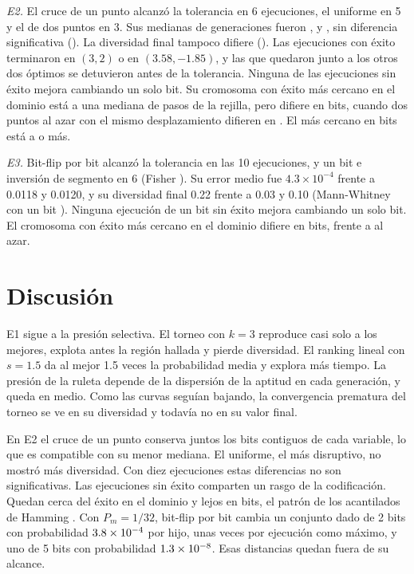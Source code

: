 \documentclass[conference]{IEEEtran}
\begin{document}
\textit{E2.} El cruce de un punto alcanzó la tolerancia en 6 ejecuciones, el uniforme en 5 y el de dos puntos en 3. Sus medianas de generaciones fueron \EdosMedianaUnPunto, \EdosMedianaUniforme{} y \EdosMedianaDosPuntos, sin diferencia significativa (\EdosKruskalGenP). La diversidad final tampoco difiere (\EdosKruskalDivP). Las \EdosExitos{} ejecuciones con éxito terminaron en $(3, 2)$ o en $(3.58, -1.85)$, y las \EdosCercaDosTres{} que quedaron junto a los otros dos óptimos se detuvieron antes de la tolerancia. Ninguna de las \EdosSinExito{} ejecuciones sin éxito mejora cambiando un solo bit. Su cromosoma con éxito más cercano en el dominio está a una mediana de \EdosPasosMediana{} pasos de la rejilla, pero difiere en \EdosHammingCercanoMediana{} bits, cuando dos puntos al azar con el mismo desplazamiento difieren en \EdosHammingAzarMediana. El más cercano en bits está a \EdosHammingMin{} o más.

\textit{E3.} Bit-flip por bit alcanzó la tolerancia en las 10 ejecuciones, y un bit e inversión de segmento en 6 (Fisher \EtresFisherP). Su error medio fue $4.3\times10^{-4}$ frente a 0.0118 y 0.0120, y su diversidad final 0.22 frente a 0.03 y 0.10 (Mann-Whitney con un bit \EtresDivMannP). Ninguna ejecución de un bit sin éxito mejora cambiando un solo bit. El cromosoma con éxito más cercano en el dominio difiere en \EtresHammingCercanoMediana{} bits, frente a \EtresHammingAzarMediana{} al azar.

\section{Discusión}

E1 sigue a la presión selectiva. El torneo con $k=3$ reproduce casi solo a los mejores, explota antes la región hallada y pierde diversidad. El ranking lineal con $s=1.5$ da al mejor 1.5 veces la probabilidad media y explora más tiempo. La presión de la ruleta depende de la dispersión de la aptitud en cada generación, y queda en medio. Como las curvas seguían bajando, la convergencia prematura del torneo se ve en su diversidad y todavía no en su valor final.

En E2 el cruce de un punto conserva juntos los bits contiguos de cada variable, lo que es compatible con su menor mediana. El uniforme, el más disruptivo, no mostró más diversidad. Con diez ejecuciones estas diferencias no son significativas. Las ejecuciones sin éxito comparten un rasgo de la codificación. Quedan cerca del éxito en el dominio y lejos en bits, el patrón de los acantilados de Hamming \cite{caruana1988}. Con $P_m=1/32$, bit-flip por bit cambia un conjunto dado de 2 bits con probabilidad $3.8\times10^{-4}$ por hijo, unas \EsperadoConcretosDos{} veces por ejecución como máximo, y uno de 5 bits con probabilidad $1.3\times10^{-8}$. Esas distancias quedan fuera de su alcance.
\end{document}
